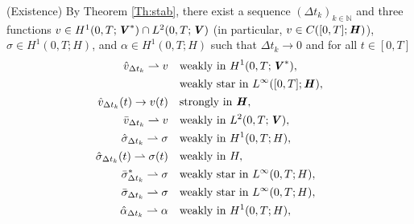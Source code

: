 \documentclass[11pt, a4paper]{article}
\newcommand{\N}{{\mathbb N}}
\newcommand{\dt}{{\Delta t}}
\newcommand{\bm}[1]{\textbf{\textit{#1}}}%
\newcommand{\Hv}{{\bm{H}}}
\newcommand{\Vv}{{\bm{V}}}
\newcommand{\Hs}{{H}}
\begin{document}
(Existence) By Theorem \ref{Th:stab}, there exist a sequence $(\dt_k)_{k\in\N}$ and three functions 
$v \in H^1(0,T;\Vv^*)\cap L^2(0,T;\Vv)$ (in particular, $v\in C([0,T];\Hv)$), $\sigma \in H^1(0,T;\Hs)$, and $\alpha \in H^1(0,T;\Hs)$ such that $\dt_k\rightarrow 0$ and for all $t\in[0,T]$
\begin{align}\label{convvhwh}
    \hat{v}_{\dt_k}\rightharpoonup v
    &\quad\text{weakly in }H^1(0,T;\Vv^*),\\
    &\quad\begin{aligned}\label{convvhwl}
        \text{weakly star in }L^\infty([0,T];\Hv),
    \end{aligned}\\
    \hat{v}_{\dt_k}(t) \rightarrow v(t)
    &\quad\begin{aligned}\label{convvhwc}
        \text{strongly in }\Hv,
    \end{aligned}\\
    \bar{v}_{\dt_k}\rightharpoonup v
    &\quad\begin{aligned}\label{convvbwl}
        \text{weakly in }L^2(0,T;\Vv),
    \end{aligned}\\
    \hat{\sigma}_{\dt_k} \rightharpoonup \sigma
    &\quad\begin{aligned}\label{convshwh}
        \text{weakly in }H^1(0,T;\Hs),
    \end{aligned}\\
    \hat{\sigma}_{\dt_k}(t) \rightharpoonup \sigma(t)
    &\quad\begin{aligned}\label{convshwc}
        \text{weakly in }\Hs,
    \end{aligned}\\
    \bar{\sigma}^*_{\dt_k} \rightharpoonup \sigma
    &\quad\begin{aligned}\label{convsswl}
        \text{weakly star in }L^\infty(0,T;\Hs),
    \end{aligned}\\
    \bar{\sigma}_{\dt_k} \rightharpoonup \sigma
    &\quad\begin{aligned}\label{convsbwl}
        \text{weakly star in }L^\infty(0,T;\Hs),
    \end{aligned}\\
    \hat{\alpha}_{\dt_k} \rightharpoonup \alpha
    &\quad\begin{aligned}\label{convahwh}
        \text{weakly in }H^1(0,T;\Hs),
    \end{aligned}\\

\end{align}
\end{document}
